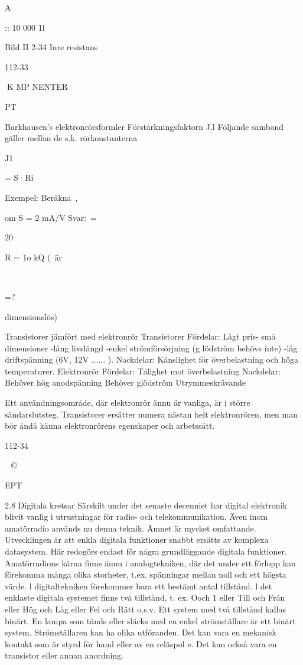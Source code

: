{{A

:: 10 000 1l

Bild II 2-34 Inre resistans

112-33

K MP NENTER

PT

Barkhausen's elektronrörsformler
Förstärkningsfaktorn J.l
Följande samband gäller mellan de s.k. rörkonstanterna

J1

= S·Ri

Exempel:
Beräkna~,

om S = 2 mA/V
Svar:~=

20

R = 1o kQ
(~är

~

=?

dimensionslös)

Transistorer jämfört med elektronrör
Transistorer
Fördelar:
Lågt pris- små dimensioner -lång livslängd
-enkel strömförsörjning (g lödström behövs
inte) -låg driftspänning (6V, 12V ...... ).
Nackdelar:
Känslighet för överbelastning och höga
temperaturer.
Elektronrör
Fördelar:
Tålighet mot överbelastning
Nackdelar:
Behöver hög anodspänning
Behöver glödström
Utrymmeskrävande

Ett användningsområde, där elektronrör
ännu är vanliga, är i större sändarslutsteg.
Transistorer ersätter numera nästan helt
elektronrören, men man bör ändå känna
elektronrörens egenskaper och arbetssätt.

112-34

~©~

EPT

2.8 Digitala kretsar
Särskilt under det senaste decenniet har
digital elektronik blivit vanlig i utrustningar
för radio- och telekommunikation. Även inom
amatörradio används nu denna teknik. Ämnet är mycket omfattande. Utvecklingen är
att enkla digitala funktioner snabbt ersätts av
komplexa datasystem. Här redogörs endast
för några grundläggande digitala funktioner.
Amatörradions kärna finns ännu i analogtekniken, där det under ett förlopp kan förekomma många olika storheter, t.ex. spänningar mellan noll och ett högsta värde.
l digitaltekniken förekommer bara ett bestämt antal tillstånd. l det enklaste digitala
systemet finns två tillstånd, t. ex. Ooch 1 eller
Till och Från eller Hög och Låg eller Fel och
Rätt o.s.v. Ett system med två tillstånd kallas
binärt. En lampa som tänds eller släcks med
en enkel strömställare är ett binärt system.
Strömställaren kan ha olika utföranden. Det
kan vara en mekanisk kontakt som är styrd
för hand eller av en reläspol e. Det kan också
vara en transistor eller annan anordning.

}}

